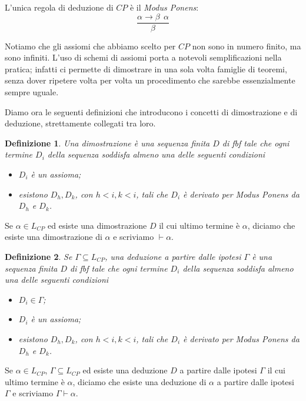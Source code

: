 \documentclass[a4paper, 12pt]{article}
\newtheorem{definition}{Definizione}
\begin{document}
L'unica regola di deduzione di $CP$ è il \textit{Modus Ponens}:
$$\frac{\alpha \rightarrow \beta \ \ \alpha}{\beta}$$

Notiamo che gli assiomi che abbiamo scelto per $CP$ non sono in numero finito,
ma sono infiniti. L'uso di schemi di assiomi porta a notevoli semplificazioni
nella pratica; infatti ci permette di dimostrare in una sola volta famiglie di teoremi,
senza dover ripetere volta per volta un procedimento che sarebbe essenzialmente sempre uguale.

Diamo ora le seguenti definizioni che introducono i concetti di dimostrazione e di
deduzione, strettamente collegati tra loro.

\begin{definition}
Una dimostrazione è una sequenza finita $D$ di fbf tale che
ogni termine $D_i$ della sequenza soddisfa almeno una delle seguenti condizioni
\begin{itemize}
\item $D_i$ è un assioma;
\item esistono $D_h, D_k$, con $h < i, k < i$, tali che $D_i$ è derivato per \textit{Modus Ponens}
da $D_h$ e $D_k$.
\end{itemize}
\end{definition}

Se $\alpha \in L_{CP}$ ed esiste una dimostrazione $D$ il cui ultimo termine è $\alpha$,
diciamo che esiste una dimostrazione di $\alpha$ e scriviamo $\vdash \alpha$.


\begin{definition}
Se $\Gamma \subseteq L_{CP}$, una deduzione a partire dalle ipotesi $\Gamma$ è una sequenza finita $D$
di fbf tale che ogni termine $D_i$ della sequenza soddisfa almeno una delle seguenti condizioni
\begin{itemize}
\item $D_i \in \Gamma$;
\item $D_i$ è un assioma;
\item esistono $D_h, D_k$, con $h < i, k < i$, tali che $D_i$ è derivato per \textit{Modus Ponens}
da $D_h$ e $D_k$.
\end{itemize}
\end{definition}

Se $\alpha \in L_{CP}$, $\Gamma \subseteq L_{CP}$ ed esiste una deduzione $D$ a partire dalle ipotesi $\Gamma$
il cui ultimo termine è $\alpha$, diciamo che esiste una deduzione di $\alpha$
a partire dalle ipotesi $\Gamma$ e scriviamo $\Gamma \vdash \alpha$.
\end{document}
